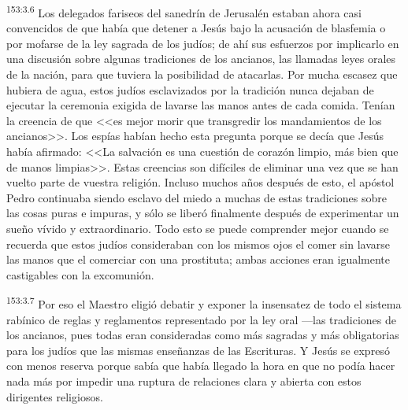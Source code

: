 \par 
\textsuperscript{153:3.6} Los delegados fariseos del sanedrín de Jerusalén estaban ahora casi convencidos de que había que detener a Jesús bajo la acusación de blasfemia o por mofarse de la ley sagrada de los judíos; de ahí sus esfuerzos por implicarlo en una discusión sobre algunas tradiciones de los ancianos, las llamadas leyes orales de la nación, para que tuviera la posibilidad de atacarlas. Por mucha escasez que hubiera de agua, estos judíos esclavizados por la tradición nunca dejaban de ejecutar la ceremonia exigida de lavarse las manos antes de cada comida. Tenían la creencia de que <<es mejor morir que transgredir los mandamientos de los ancianos>>. Los espías habían hecho esta pregunta porque se decía que Jesús había afirmado: <<La salvación es una cuestión de corazón limpio, más bien que de manos limpias>>. Estas creencias son difíciles de eliminar una vez que se han vuelto parte de vuestra religión. Incluso muchos años después de esto, el apóstol Pedro continuaba siendo esclavo del miedo a muchas de estas tradiciones sobre las cosas puras e impuras, y sólo se liberó finalmente después de experimentar un sueño vívido y extraordinario. Todo esto se puede comprender mejor cuando se recuerda que estos judíos consideraban con los mismos ojos el comer sin lavarse las manos que el comerciar con una prostituta; ambas acciones eran igualmente castigables con la excomunión.

\par 
\textsuperscript{153:3.7} Por eso el Maestro eligió debatir y exponer la insensatez de todo el sistema rabínico de reglas y reglamentos representado por la ley oral ---las tradiciones de los ancianos, pues todas eran consideradas como más sagradas y más obligatorias para los judíos que las mismas enseñanzas de las Escrituras. Y Jesús se expresó con menos reserva porque sabía que había llegado la hora en que no podía hacer nada más por impedir una ruptura de relaciones clara y abierta con estos dirigentes religiosos.

